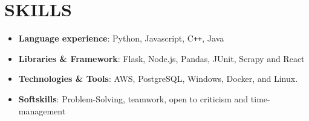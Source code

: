 \documentclass[12pt]{extarticle}
\begin{document}
\section*{SKILLS}
\begin{itemize}
  \item \textbf{Language experience}: Python, Javascript, C\texttt{++}, Java
  \item \textbf{Libraries \& Framework}: Flask, Node.js, Pandas, JUnit, Scrapy and React
  \item \textbf{Technologies \& Tools}: AWS, PostgreSQL, Windows, Docker, and Linux.
  \item \textbf{Softskills}: Problem-Solving, teamwork, open to criticism and time-management
\end{itemize}
\end{document}
